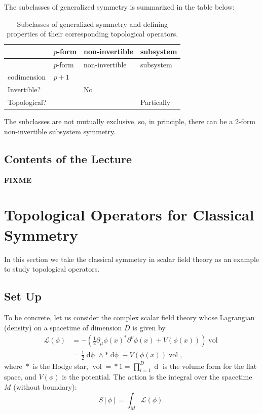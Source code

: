 \documentclass[
  letterpaper,
  DIV=11,
  numbers=noendperiod]{scrreport}
\DeclareMathOperator{\vol}{vol}
\newcommand{\stdim}{D}
\begin{document}
The subclasses of generalized symmetry is summarized in the table below:

\hypertarget{tbl-sym-classes}{}
\begin{longtable}[]{@{}llll@{}}
\caption{\label{tbl-sym-classes}Subclasses of generalized symmetry and
defining properties of their corresponding topological
operators.}\tabularnewline
\toprule\noalign{}
& \(p\)-form & non-invertible & subsystem \\
\midrule\noalign{}
\endfirsthead
\toprule\noalign{}
& \(p\)-form & non-invertible & subsystem \\
\midrule\noalign{}
\endhead
\bottomrule\noalign{}
\endlastfoot
codimension & \(p+1\) & & \\
Invertible? & & No & \\
Topological? & & & Partically \\
\end{longtable}

The subclasses are not mutually exclusive, so, in principle, there can
be a 2-form non-invertible subsystem symmetry.

\hypertarget{contents-of-the-lecture}{%
\section{Contents of the Lecture}\label{contents-of-the-lecture}}

\textbf{FIXME}


\hypertarget{sec-scalar}{%
\chapter{Topological Operators for Classical
Symmetry}\label{sec-scalar}}

In this section we take the classical symmetry in scalar field theory as
an example to study topological operators.

\hypertarget{set-up}{%
\section{Set Up}\label{set-up}}

To be concrete, let us consider the complex scalar field theory whose
Lagrangian (density) on a spacetime of dimension \(\stdim\) is given by
\[
\begin{aligned}
\mathcal{L}(\phi) &=  - \left(\frac12 \partial_\mu \phi(x)^* \partial^\nu \phi(x) + V(\phi(x))\right)\vol\\
&= \frac{1}{2} \mathop{d\phi} \wedge *\mathop{d\phi} - V(\phi(x))\vol,
\end{aligned}
\] where \(\mathop{*}\) is the Hodge star,
\(\vol = \mathop{*} 1 = \prod_{i=1}^{\stdim} \mathop{dx_i}\) is the
volume form for the flat space, and \(V(\phi)\) is the potential. The
action is the integral over the spacetime \(M\) (without boundary): \[
S[\phi] = \int_{M}\mathcal{L}(\phi).
\]
\end{document}
